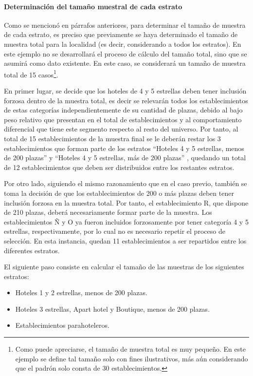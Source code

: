 \documentclass[
]{book}
\begin{document}
\hypertarget{determinaciuxf3n-del-tamauxf1o-muestral-de-cada-estrato}{%
\paragraph{Determinación del tamaño muestral de cada estrato}\label{determinaciuxf3n-del-tamauxf1o-muestral-de-cada-estrato}}

Como se mencionó en párrafos anteriores, para determinar el tamaño de muestra de cada estrato, es preciso que previamente se haya determinado el tamaño de muestra total para la localidad (es decir, considerando a todos los estratos). En este ejemplo no se desarrollará el proceso de cálculo del tamaño total, sino que se asumirá como dato existente. En este caso, se considerará un tamaño de muestra total de 15 casos\footnote{Como puede apreciarse, el tamaño de muestra total es muy pequeño. En este ejemplo se define tal tamaño solo con fines ilustrativos, más aún considerando que el padrón solo consta de 30 establecimientos.}.

En primer lugar, se decide que los hoteles de 4 y 5 estrellas deben tener inclusión forzosa dentro de la muestra total, es decir se relevarán todos los establecimientos de estas categorías independientemente de su cantidad de plazas, debido al bajo peso relativo que presentan en el total de establecimientos y al comportamiento diferencial que tiene este segmento respecto al resto del universo. Por tanto, al total de 15 establecimientos de la muestra final se le deberán restar los 3 establecimientos que forman parte de los estratos ``Hoteles 4 y 5 estrellas, menos de 200 plazas'' y ``Hoteles 4 y 5 estrellas, más de 200 plazas'' , quedando un total de 12 establecimientos que deben ser distribuidos entre los restantes estratos.

Por otro lado, siguiendo el mismo razonamiento que en el caso previo, también se toma la decisión de que los establecimientos de 200 o más plazas deben tener inclusión forzosa en la muestra total. Por tanto, el establecimiento R, que dispone de 210 plazas, deberá necesariamente formar parte de la muestra. Los establecimientos Ñ y O ya fueron incluidos forzosamente por tener categoría 4 y 5 estrellas, respectivamente, por lo cual no es necesario repetir el proceso de selección. En esta instancia, quedan 11 establecimientos a ser repartidos entre los diferentes estratos.

El siguiente paso consiste en calcular el tamaño de las muestras de los siguientes estratos:

\begin{itemize}
\item
  Hoteles 1 y 2 estrellas, menos de 200 plazas.
\item
  Hoteles 3 estrellas, Apart hotel y Boutique, menos de 200 plazas.
\item
  Establecimientos parahoteleros.
\end{itemize}
\end{document}
